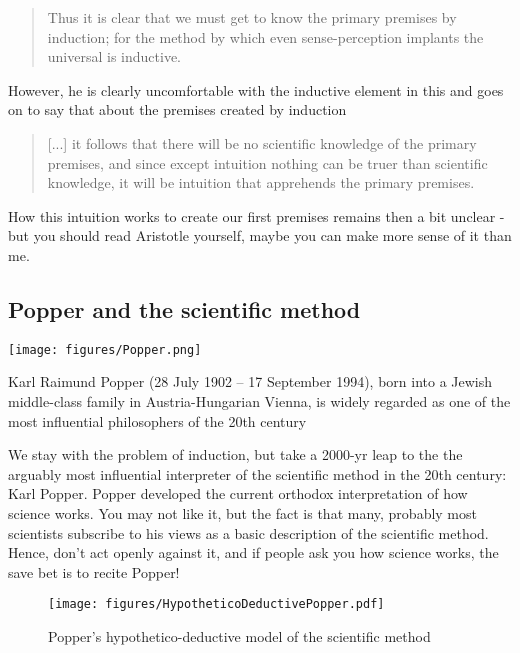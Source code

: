 \documentclass{tufte-book}
\begin{document}
\begin{quote}
    Thus it is clear that we must get to know the primary premises by induction; for the method by which even sense-perception implants the universal is inductive.
\end{quote}

However, he is clearly uncomfortable with the inductive element in this and goes on to say that about the premises created by induction

\begin{quote}
[...] it follows that there will be no scientific knowledge of the primary premises, and since except intuition nothing can be truer than scientific knowledge, it will be intuition that apprehends the primary premises.
\end{quote}

How this intuition works to create our first premises remains then a bit unclear - but you should read Aristotle yourself, maybe you can make more sense of it than me.

\subsection{Popper and the scientific method}

\begin{marginfigure}%
  \texttt{[image: figures/Popper.png]}
  \caption{Karl Raimund Popper (28 July 1902 – 17 September 1994), born into a Jewish middle-class family in Austria-Hungarian Vienna, is widely regarded as one of the most influential philosophers of the 20th century}
  \label{fig: PopperPotrait}
\end{marginfigure}

We stay with the problem of induction, but take a 2000-yr leap to the the arguably most influential interpreter of the scientific method in the 20th century: Karl Popper. Popper developed the current orthodox interpretation of how science works. You may not like it, but the fact is that many, probably most scientists subscribe to his views as a basic description of the scientific method. Hence, don't act openly against it, and if people ask you how science works, the save bet is to recite Popper!


\begin{figure}[]
\begin{center}
\texttt{[image: figures/HypotheticoDeductivePopper.pdf]}
\caption{Popper's hypothetico-deductive model of the scientific method}
\label{fig: InductiveDeductiveAristotle}
\end{center}
\end{figure}
\end{document}
